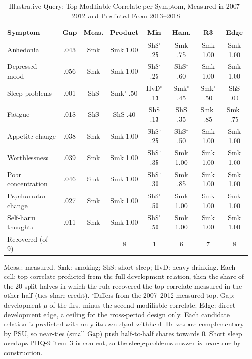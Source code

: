 \documentclass[journal]{IEEEtran}
\begin{document}
\setcounter{table}{8}\begin{table}[!t]
\caption{Illustrative Query: Top Modifiable Correlate per Symptom, Measured in 2007--2012 and Predicted From 2013--2018}

\centering
\scriptsize
\setlength{\tabcolsep}{1.3pt}
\begin{tabular}{@{}l c c c c c c c@{}}
\toprule
Symptom & Gap & Meas. & Product & Min & Ham. & R3 & Edge\\
\midrule
Anhedonia & .043 & Smk & Smk 1.00 & ShS$^\circ$ .25 & Smk .75 & Smk 1.00 & Smk 1.00\\
Depressed mood & .056 & Smk & Smk 1.00 & ShS$^\circ$ .25 & ShS$^\circ$ .60 & Smk 1.00 & Smk 1.00\\
Sleep problems & .001 & ShS & Smk$^\circ$ .50 & HvD$^\circ$ .13 & Smk$^\circ$ .45 & Smk$^\circ$ .50 & ShS .00\\
Fatigue & .018 & ShS & ShS .40 & ShS .13 & ShS .35 & Smk$^\circ$ .85 & Smk$^\circ$ .75\\
Appetite change & .038 & Smk & Smk 1.00 & ShS$^\circ$ .25 & ShS$^\circ$ .50 & Smk 1.00 & Smk 1.00\\
Worthlessness & .039 & Smk & Smk 1.00 & ShS$^\circ$ .35 & Smk 1.00 & Smk 1.00 & Smk 1.00\\
Poor concentration & .046 & Smk & Smk 1.00 & ShS$^\circ$ .30 & Smk .85 & Smk 1.00 & Smk 1.00\\
Psychomotor change & .027 & Smk & Smk 1.00 & ShS$^\circ$ .50 & Smk 1.00 & Smk 1.00 & Smk 1.00\\
Self-harm thoughts & .011 & Smk & Smk 1.00 & ShS$^\circ$ .50 & Smk 1.00 & Smk 1.00 & Smk 1.00\\
\midrule
Recovered (of 9) & & & 8 & 1 & 6 & 7 & 8\\
\bottomrule
\end{tabular}

\smallskip
\parbox{\columnwidth}{\footnotesize Meas.: measured. Smk: smoking; ShS: short sleep; HvD: heavy drinking. Each cell: top correlate predicted from the full development relation, then the share of the 20 split halves in which the rule recovered the top correlate measured in the other half (ties share credit). $^\circ$Differs from the 2007--2012 measured top. Gap: development $\mu$ of the first minus the second modifiable correlate. Edge: direct development edge, a ceiling for the cross-period design only. Each candidate relation is predicted with only its own dyad withheld. Halves are complementary by PSU, so near-ties (small Gap) push half-to-half shares towards 0. Short sleep overlaps PHQ-9 item~3 in content, so the sleep-problems answer is near-true by construction.}
\end{table}
\end{document}
